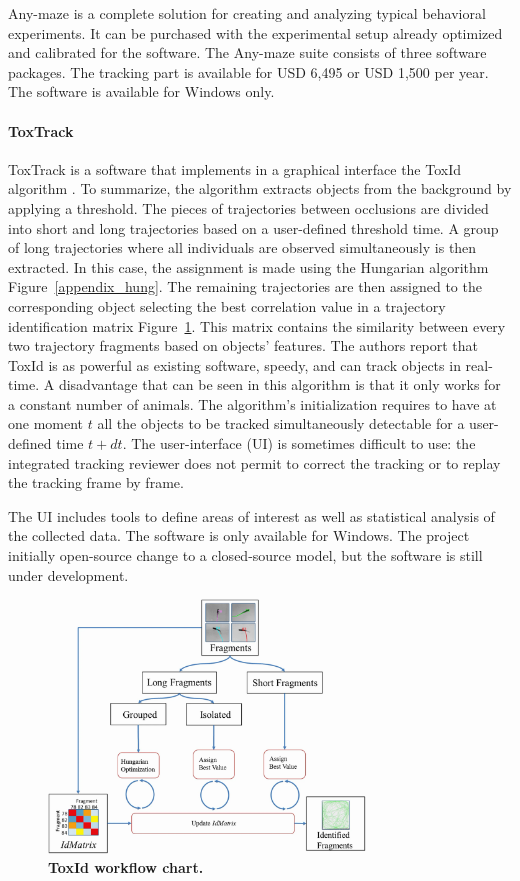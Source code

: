     Any-maze is a complete solution for creating and analyzing typical behavioral experiments. It can be purchased with the experimental setup already optimized and calibrated for the software. The Any-maze suite consists of three software packages. The tracking part is available for USD 6,495 or USD 1,500 per year. The software is available for Windows only.

    \paragraph{ToxTrack}
    ToxTrack \cite{rodriguez2018toxtrac} is a software that implements in a graphical interface the ToxId algorithm \cite{rodriguez2017toxid}. To summarize, the algorithm extracts objects from the background by applying a threshold. The pieces of trajectories between occlusions are divided into short and long trajectories based on a user-defined threshold time. A group of long trajectories where all individuals are observed simultaneously is then extracted. In this case, the assignment is made using the Hungarian algorithm Figure~\ref{appendix_hung}. The remaining trajectories are then assigned to the corresponding object selecting the best correlation value in a trajectory identification matrix Figure~\ref{part_1:toxId}. This matrix contains the similarity between every two trajectory fragments based on objects' features.
    The authors report that ToxId is as powerful as existing software, speedy, and can track objects in real-time. A disadvantage that can be seen in this algorithm is that it only works for a constant number of animals. The algorithm's initialization requires to have at one moment $t$ all the objects to be tracked simultaneously detectable for a user-defined time $t+dt$. The user-interface (UI) is sometimes difficult to use: the integrated tracking reviewer does not permit to correct the tracking or to replay the tracking frame by frame.

    The UI includes tools to define areas of interest as well as statistical analysis of the collected data. The software is only available for Windows. The project initially open-source change to a closed-source model, but the software is still under development.

    \begin{figure}[h]
    \centering
    \includegraphics[width=0.75\textwidth]{part_1/assets/toxId.png}
    \caption{{\bf ToxId workflow chart.}}
    \label{part_1:toxId}
    \end{figure}

